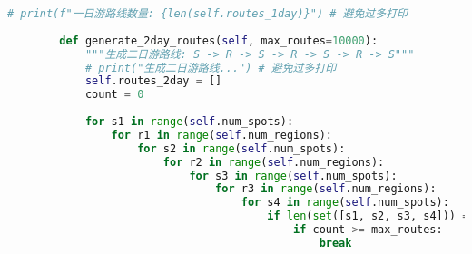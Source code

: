 \begin{lstlisting}[language=Python]
            # print(f"一日游路线数量: {len(self.routes_1day)}") # 避免过多打印
        
        def generate_2day_routes(self, max_routes=10000):
            """生成二日游路线: S -> R -> S -> R -> S -> R -> S"""
            # print("生成二日游路线...") # 避免过多打印
            self.routes_2day = []
            count = 0
            
            for s1 in range(self.num_spots):
                for r1 in range(self.num_regions):
                    for s2 in range(self.num_spots):
                        for r2 in range(self.num_regions):
                            for s3 in range(self.num_spots):
                                for r3 in range(self.num_regions):
                                    for s4 in range(self.num_spots):
                                        if len(set([s1, s2, s3, s4])) == 4:  # 所有景点不重复
                                            if count >= max_routes:
                                                break
                                            

\end{lstlisting}
